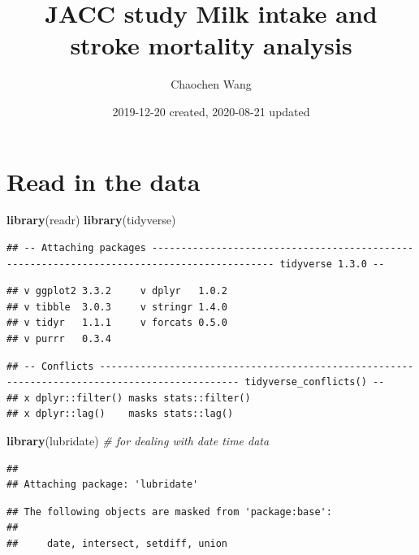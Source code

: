 \documentclass[
]{article}
\title{JACC study Milk intake and stroke mortality analysis}
\author{Chaochen Wang}
\date{2019-12-20 created, 2020-08-21 updated}
\newenvironment{Shaded}{\begin{snugshade}}{\end{snugshade}}
\newcommand{\CommentTok}[1]{\textcolor[rgb]{0.56,0.35,0.01}{\textit{#1}}}
\newcommand{\KeywordTok}[1]{\textcolor[rgb]{0.13,0.29,0.53}{\textbf{#1}}}
\newcommand{\NormalTok}[1]{#1}
\begin{document}
\maketitle

{
\setcounter{tocdepth}{3}
\tableofcontents
}
\hypertarget{read-in-the-data}{%
\section{Read in the data}\label{read-in-the-data}}

\begin{Shaded}
\begin{Highlighting}[]
\KeywordTok{library}\NormalTok{(readr)}
\KeywordTok{library}\NormalTok{(tidyverse)}
\end{Highlighting}
\end{Shaded}

\begin{verbatim}
## -- Attaching packages ------------------------------------------------------------------------------------------- tidyverse 1.3.0 --
\end{verbatim}

\begin{verbatim}
## v ggplot2 3.3.2     v dplyr   1.0.2
## v tibble  3.0.3     v stringr 1.4.0
## v tidyr   1.1.1     v forcats 0.5.0
## v purrr   0.3.4
\end{verbatim}

\begin{verbatim}
## -- Conflicts ---------------------------------------------------------------------------------------------- tidyverse_conflicts() --
## x dplyr::filter() masks stats::filter()
## x dplyr::lag()    masks stats::lag()
\end{verbatim}

\begin{Shaded}
\begin{Highlighting}[]
\KeywordTok{library}\NormalTok{(lubridate) }\CommentTok{# for dealing with date time data }
\end{Highlighting}
\end{Shaded}

\begin{verbatim}
## 
## Attaching package: 'lubridate'
\end{verbatim}

\begin{verbatim}
## The following objects are masked from 'package:base':
## 
##     date, intersect, setdiff, union
\end{verbatim}
\end{document}
